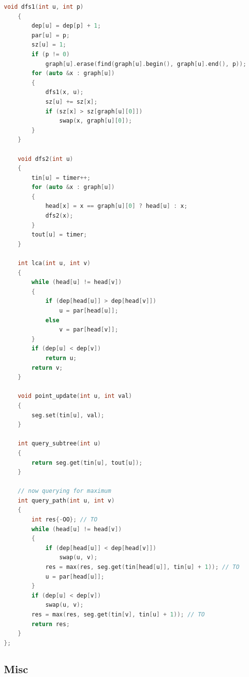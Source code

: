\documentclass[10pt,landscape,a4paper,twocolumn]{article}
\begin{document}
\begin{lstlisting}[language=C++]
    void dfs1(int u, int p)
    {
        dep[u] = dep[p] + 1;
        par[u] = p;
        sz[u] = 1;
        if (p != 0)
            graph[u].erase(find(graph[u].begin(), graph[u].end(), p));
        for (auto &x : graph[u])
        {
            dfs1(x, u);
            sz[u] += sz[x];
            if (sz[x] > sz[graph[u][0]])
                swap(x, graph[u][0]);
        }
    }

    void dfs2(int u)
    {
        tin[u] = timer++;
        for (auto &x : graph[u])
        {
            head[x] = x == graph[u][0] ? head[u] : x;
            dfs2(x);
        }
        tout[u] = timer;
    }

    int lca(int u, int v)
    {
        while (head[u] != head[v])
        {
            if (dep[head[u]] > dep[head[v]])
                u = par[head[u]];
            else
                v = par[head[v]];
        }
        if (dep[u] < dep[v])
            return u;
        return v;
    }

    void point_update(int u, int val)
    {
        seg.set(tin[u], val);
    }

    int query_subtree(int u)
    {
        return seg.get(tin[u], tout[u]);
    }

    // now querying for maximum
    int query_path(int u, int v)
    {
        int res{-OO}; // TO
        while (head[u] != head[v])
        {
            if (dep[head[u]] < dep[head[v]])
                swap(u, v);
            res = max(res, seg.get(tin[head[u]], tin[u] + 1)); // TO
            u = par[head[u]];
        }
        if (dep[u] < dep[v])
            swap(u, v);
        res = max(res, seg.get(tin[v], tin[u] + 1)); // TO
        return res;
    }
};

\end{lstlisting}
\subsection{Misc}
\end{document}
